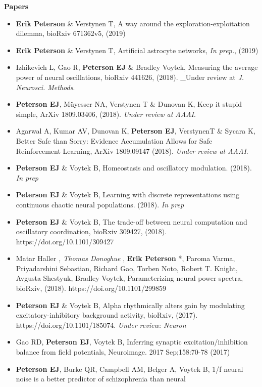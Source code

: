 \textbf{Papers}

\begin{itemize}
\item
  \textbf{Erik Peterson} \& Verstynen T, A way around the
  exploration-exploitation dilemma, bioRxiv 671362v5, (2019)
\item
  \textbf{Erik Peterson} \& Verstynen T, Artificial astrocyte networks,
  \emph{In prep.}, (2019)
\item
  Izhikevich L, Gao R, \textbf{Peterson EJ} \& Bradley Voytek, Measuring
  the average power of neural oscillations, bioRxiv 441626, (2018).
  \_Under review at \emph{J. Neurosci. Methods}.
\item
  \textbf{Peterson EJ}, Müyesser NA, Verstynen T \& Dunovan K, Keep it
  stupid simple, ArXiv 1809.03406, (2018). \emph{Under review at AAAI}.
\item
  Agarwal A, Kumar AV, Dunovan K, \textbf{Peterson EJ}, VerstynenT \&
  Sycara K, Better Safe than Sorry: Evidence Accumulation Allows for
  Safe Reinforcement Learning, ArXiv 1809.09147 (2018). \emph{Under
  review at AAAI}.
\item
  \textbf{Peterson EJ} \& Voytek B, Homeostasis and oscillatory
  modulation. (2018). \emph{In prep}
\item
  \textbf{Peterson EJ} \& Voytek B, Learning with discrete
  representations using continuous chaotic neural populations. (2018).
  \emph{In prep}
\item
  \textbf{Peterson EJ} \& Voytek B, The trade-off between neural
  computation and oscillatory coordination, bioRxiv 309427, (2018).
  https://doi.org/10.1101/309427
\item
  Matar Haller \emph{, Thomas Donoghue }, \textbf{Erik Peterson} *,
  Paroma Varma, Priyadarshini Sebastian, Richard Gao, Torben Noto,
  Robert T. Knight, Avgusta Shestyuk, Bradley Voytek, Parameterizing
  neural power spectra, bioRxiv, (2018). https://doi.org/10.1101/299859
\item
  \textbf{Peterson EJ} \& Voytek B, Alpha rhythmically alters gain by
  modulating excitatory-inhibitory background activity, bioRxiv, (2017).
  https://doi.org/10.1101/185074. \emph{Under review: Neuron}
\item
  Gao RD, \textbf{Peterson EJ}, Voytek B, Inferring synaptic
  excitation/inhibition balance from field potentials, Neuroimage. 2017
  Sep;158:70-78 (2017)
\item
  \textbf{Peterson EJ}, Burke QR, Campbell AM, Belger A, Voytek B, 1/f
  neural noise is a better predictor of schizophrenia than neural

\end{itemize}
